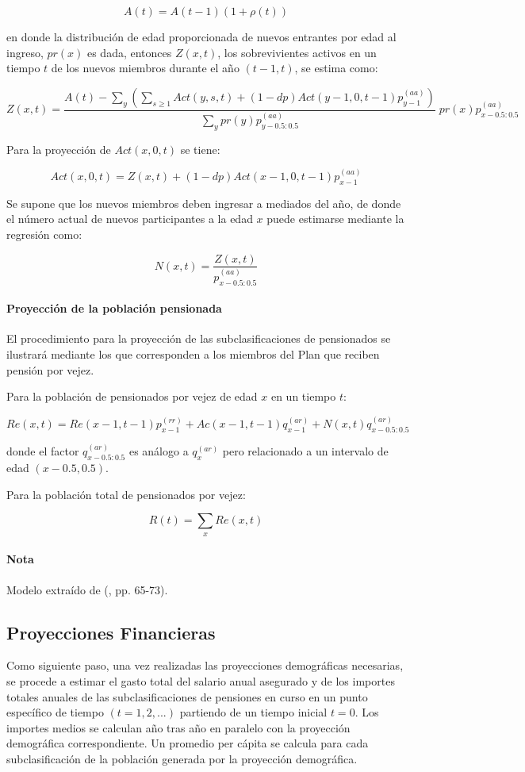 \documentclass[12pt,letterpaper,titlepage]{article}
\begin{document}
{\[ A(t)=A(t-1)(1+\rho(t)) \]

en donde la distribución de edad proporcionada de nuevos entrantes por edad al ingreso, $pr(x)$ es dada, entonces $Z(x,t)$, los sobrevivientes activos en un tiempo $t$ de los nuevos miembros durante el año $(t-1,t)$, se estima como:

\begin{equation*}
Z(x,t)=\dfrac{A(t)-\sum\limits_{y}\left( \sum\limits_{s\geq1}Act(y,s,t)+(1-dp)Act(y-1,0,t-1)p^{(aa)}_{y-1}\right) }{\sum\limits_{y}pr(y)p^{(aa)}_{y-0.5:0.5}}\;pr(x)p^{(aa)}_{x-0.5:0.5} 
\end{equation*}

Para la proyección de $Act(x,0,t)$ se tiene:

\[ Act(x,0,t)=Z(x,t)+(1-dp)Act(x-1,0,t-1)p^{(aa)}_{x-1} \]

Se supone que los nuevos miembros deben ingresar a mediados del año, de donde el número actual de nuevos participantes a la edad $x$ puede estimarse mediante la regresión como:

\[ N(x,t)=\frac{Z(x,t)}{p^{(aa)}_{x-0.5:0.5}} \]

\paragraph{Proyección de la población pensionada}
El procedimiento para la proyección de las subclasificaciones de pensionados se ilustrará mediante los que corresponden a los miembros del Plan que reciben pensión por vejez.

Para la población de pensionados por vejez de edad $x$ en un tiempo $t$:

\[ Re(x,t)=Re(x-1,t-1)p^{(rr)}_{x-1}+Ac(x-1,t-1)q_{x-1}^{(ar)}+N(x,t)q^{(ar)}_{x-0.5:0.5} \]

donde el factor $q_{x-0.5:0.5}^{(ar)}$ es análogo a $q_{x}^{(ar)}$ pero relacionado a un intervalo de edad $(x-0.5,0.5)$.

Para la población total de pensionados por vejez:

\[ R(t)=\sum\limits_{x}Re(x,t) \]

\paragraph{Nota}Modelo extraído de (\cite{amssp}, pp. 65-73). 

\subsection{Proyecciones Financieras}
Como siguiente paso, una vez realizadas las proyecciones demográficas necesarias, se procede a estimar el gasto total del salario anual asegurado y de los importes totales anuales de las subclasificaciones de pensiones en curso en un punto específico de tiempo $(t=1,2,...)$ partiendo de un tiempo inicial $t=0$. Los importes medios se calculan año tras año en paralelo con la proyección demográfica correspondiente. Un promedio per cápita se calcula para cada subclasificación de la población generada por la proyección demográfica. 

}
\end{document}
